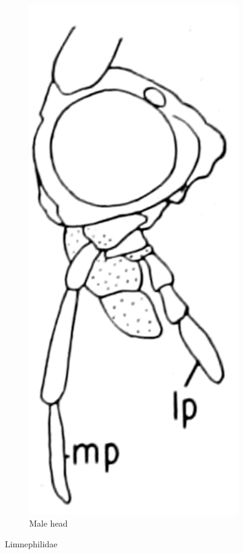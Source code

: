 \documentclass[letterpaper, 11pt]{article}
\begin{document}
\begin{figure}[ht!]
\begin{subfigure}[ht!]{0.15\textwidth}
        \includegraphics[width=\textwidth]{LimnephilidHead}
        \caption{Male head \citep[][Fig. 65]{bhl50956}}
        \label{fig:limnephilid2}
    \end{subfigure}
    \caption{Limnephilidae}\label{fig:limnephilids}
\end{figure}



\end{document}

